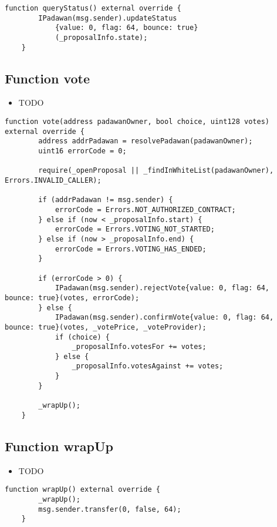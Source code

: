 \begin{lstlisting}[firstnumber=191]
    function queryStatus() external override {
        IPadawan(msg.sender).updateStatus
            {value: 0, flag: 64, bounce: true}
            (_proposalInfo.state);
    }
\end{lstlisting}

\subsection{Function vote}

\begin{itemize}
\item TODO
\end{itemize}

\begin{lstlisting}[firstnumber=84]
    function vote(address padawanOwner, bool choice, uint128 votes) external override {
        address addrPadawan = resolvePadawan(padawanOwner);
        uint16 errorCode = 0;

        require(_openProposal || _findInWhiteList(padawanOwner), Errors.INVALID_CALLER);

        if (addrPadawan != msg.sender) {
            errorCode = Errors.NOT_AUTHORIZED_CONTRACT;
        } else if (now < _proposalInfo.start) {
            errorCode = Errors.VOTING_NOT_STARTED;
        } else if (now > _proposalInfo.end) {
            errorCode = Errors.VOTING_HAS_ENDED;
        }

        if (errorCode > 0) {
            IPadawan(msg.sender).rejectVote{value: 0, flag: 64, bounce: true}(votes, errorCode);
        } else {
            IPadawan(msg.sender).confirmVote{value: 0, flag: 64, bounce: true}(votes, _votePrice, _voteProvider);
            if (choice) {
                _proposalInfo.votesFor += votes;
            } else {
                _proposalInfo.votesAgainst += votes;
            }
        }

        _wrapUp();
    }
\end{lstlisting}

\subsection{Function wrapUp}

\begin{itemize}
\item TODO
\end{itemize}

\begin{lstlisting}[firstnumber=73]
    function wrapUp() external override {
        _wrapUp();
        msg.sender.transfer(0, false, 64);
    }
\end{lstlisting}


